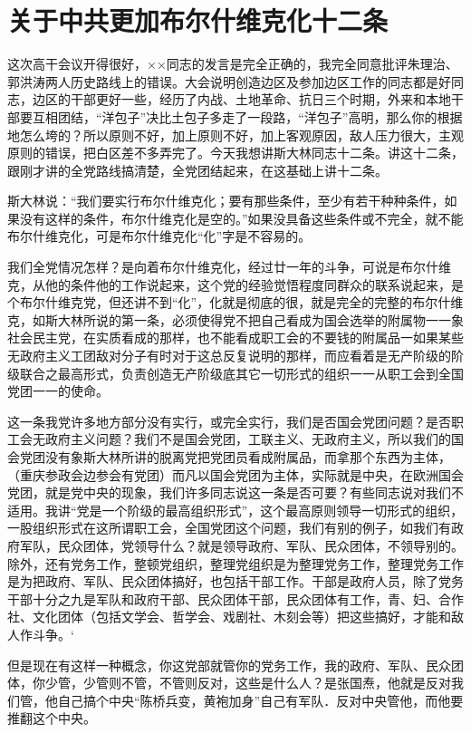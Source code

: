 \section[关于中共更加布尔什维克化十二条（一九四二年十一月二十三日）]{关于中共更加布尔什维克化十二条}


这次高干会议开得很好，××同志的发言是完全正确的，我完全同意批评朱理治、郭洪涛两人历史路线上的错误。大会说明创造边区及参加边区工作的同志都是好同志，边区的干部更好一些，经历了内战、土地革命、抗日三个时期，外来和本地干部要互相团结，“洋包子”决比土包子多走了一段路，“洋包子”高明，那么你的根据地怎么垮的？所以原则不好，加上原则不好，加上客观原因，敌人压力很大，主观原则的错误，把白区差不多弄完了。今天我想讲斯大林同志十二条。讲这十二条，跟刚才讲的全党路线搞清楚，全党团结起来，在这基础上讲十二条。

斯大林说：“我们要实行布尔什维克化；要有那些条件，至少有若干种种条件，如果没有这样的条件，布尔什维克化是空的。”如果没具备这些条件或不完全，就不能布尔什维克化，可是布尔什维克化“化”字是不容易的。

我们全党情况怎样？是向着布尔什维克化，经过廿一年的斗争，可说是布尔什维克，从他的条件他的工作说起来，这个党的经验觉悟程度同群众的联系说起来，是个布尔什维克党，但还讲不到“化”，化就是彻底的很，就是完全的完整的布尔什维克，如斯大林所说的第一条，必须使得党不把自己看成为国会选举的附属物一一象社会民主党，在实质看成的那样，也不能看成职工会的不要钱的附属品一如果某些无政府主义工团敌对分子有时对于这总反复说明的那样，而应看着是无产阶级的阶级联合之最高形式，负责创造无产阶级底其它一切形式的组织一一从职工会到全国党团一一的使命。

这一条我党许多地方部分没有实行，或完全实行，我们是否国会党团问题？是否职工会无政府主义问题？我们不是国会党团，工联主义、无政府主义，所以我们的国会党团没有象斯大林所讲的脱离党把党团员看成附属品，而拿那个东西为主体，（重庆参政会边参会有党团）而凡以国会党团为主体，实际就是中央，在欧洲国会党团，就是党中央的现象，我们许多同志说这一条是否可要？有些同志说对我们不适用。我讲“党是一个阶级的最高组织形式”，这个最高原则领导一切形式的组织，一股组织形式在这所谓职工会，全国党团这个问题，我们有别的例子，如我们有政府军队，民众团体，党领导什么？就是领导政府、军队、民众团体，不领导别的。除外，还有党务工作，整顿党组织，整理党组织是为整理党务工作，整理党务工作是为把政府、军队、民众团体搞好，也包括干部工作。干部是政府人员，除了党务干部十分之九是军队和政府干部、民众团体干部，民众团体有工作，青、妇、合作社、文化团体（包括文学会、哲学会、戏剧社、木刻会等）把这些搞好，才能和敌人作斗争。‘

但是现在有这样一种概念，你这党部就管你的党务工作，我的政府、军队、民众团体，你少管，少管则不管，不管则反对，这些是什么人？是张国焘，他就是反对我们管，他自己搞个中央“陈桥兵变，黄袍加身”自己有军队．反对中央管他，而他要推翻这个中央。

